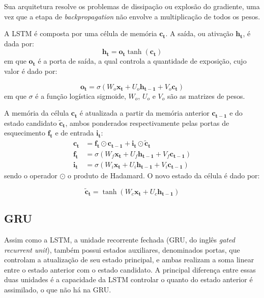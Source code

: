 Sua arquitetura resolve os problemas de dissipação ou explosão do
gradiente, uma vez que a etapa de \textit{backpropagation} não envolve a
multiplicação de todos os pesos.

A LSTM é composta por uma célula de memória $\mathbf{c_t}$. A saída, ou ativação
$\mathbf{h_t}$, é dada por:
\begin{equation}
    \mathbf{h_t} = \mathbf{o_t}\tanh(\mathbf{c_t})
\end{equation}
em que $\mathbf{o_t}$ é a porta de saída, a qual controla a quantidade de
exposição, cujo valor é dado por:

\begin{equation}
    \mathbf{o_t} = \sigma(W_o\mathbf{x_t} + U_o\mathbf{h_{t-1}} + V_o\mathbf{c_t})
\end{equation}
em que $\sigma$ é a função logística sigmoide, $W_o$, $U_o$ e $V_o$ são as
matrizes de pesos.

A memória da célula $\mathbf{c_t}$ é atualizada a partir da memória anterior
$\mathbf{c_{t-1}}$ e do estado candidato $\mathbf{\tilde{c}_t}$, ambos ponderados
respectivamente pelas portas de esquecimento $\mathbf{f_t}$ e de entrada $\mathbf{i_t}$:
\begin{align}
    \mathbf{c_t} &= \mathbf{f_t} \odot \mathbf{c_{t-1}} + \mathbf{i_t} \odot \mathbf{\tilde{c}_t} \\
    \mathbf{f_t} &= \sigma(W_f\mathbf{x_t} + U_f\mathbf{h_{t-1}} + V_f\mathbf{c_{t-1}}) \\
    \mathbf{i_t} &= \sigma(W_i\mathbf{x_t} + U_i\mathbf{h_{t-1}} + V_i\mathbf{c_{t-1}})
\end{align}
sendo o operador $\odot$ o produto
de Hadamard. O novo estado da célula é dado por:

\begin{equation}
    \mathbf{\tilde{c}_t} = \tanh(W_c\mathbf{x_t} + U_c\mathbf{h_{t-1}})
\end{equation}


\subsection{GRU}
Assim como a LSTM, a unidade recorrente fechada (GRU, do inglês \textit{gated
recurrent unit}), também possui estados auxiliares, denominados portas, que
controlam a atualização de seu estado principal, e ambas realizam a soma linear
entre o estado anterior com o estado candidato. A principal diferença entre
essas duas unidades é a capacidade da LSTM controlar o quanto do estado anterior
é assimilado, o que não há na GRU.

